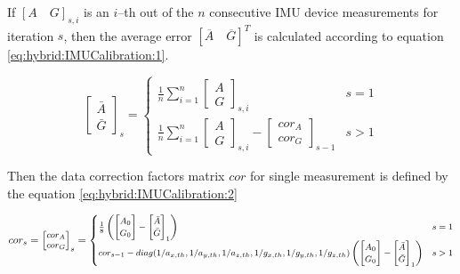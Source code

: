 \documentclass[sensors,article,submit,moreauthors,pdftex,10pt,a4paper]{mdpi}
\begin{document}
	If $[A\quad G]_{s,i}$ is an $i$--th out of the $n$ consecutive IMU device measurements for iteration $s$, then the average error $[\overline{A}\quad \overline{G}]^T$ is calculated according to equation \ref{eq:hybrid:IMUCalibration:1}.
	
	\begin{equation}
		\begin{bmatrix} \bar{A} \\ \bar{G} \end{bmatrix}_s =
		\begin{cases}
			\frac{1}{n}\sum_{i=1}^{n}{\begin{bmatrix}A \\ G\end{bmatrix}_{s,i}} & s = 1\\
			\frac{1}{n}\sum_{i=1}^{n}{\begin{bmatrix}A \\ G\end{bmatrix}_{s,i} - \begin{bmatrix}cor_A\\ cor_G\end{bmatrix}_{s-1}} &  s > 1
		\end{cases}
		\label{eq:hybrid:IMUCalibration:1}
	\end{equation}

	Then the data correction factors matrix $cor$ for single measurement is defined by the equation \ref{eq:hybrid:IMUCalibration:2}
	
	\begin{equation}
		\footnotesize
		cor_s = \begin{bmatrix}cor_A\\ cor_G\end{bmatrix}_s =
		\begin{cases}
			\frac{1}{8}\left(\begin{bmatrix}A_0                                                                          \\ G_0\end{bmatrix} - \begin{bmatrix}\bar{A}\\ \bar{G}\end{bmatrix}_1\right) & s = 1\\
			cor_{s-1} - diag(1/a_{x,th},1/a_{y,th},1/a_{z,th},1/g_{x,th},1/g_{y,th},1/g_{z,th}) \left(\begin{bmatrix}A_0 \\ G_0\end{bmatrix} - \begin{bmatrix}\bar{A}\\ \bar{G}\end{bmatrix}_1\right) & s > 1
		\end{cases}
		\label{eq:hybrid:IMUCalibration:2}
	\end{equation}	
	
\end{document}
